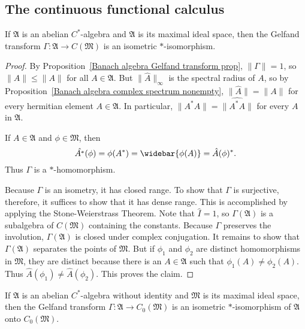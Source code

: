 \subsection{The continuous functional calculus}
\begin{theorem}\label{C^* algebra Gelfand transform prop}
If $\mathfrak{A}$ is an abelian $C^*$-algebra and $\mathfrak{A}$ is its maximal ideal space, then the Gelfand transform $\Gamma:\mathfrak{A}\to C(\mathfrak{M})$ is an isometric $*$-isomorphism.
\end{theorem}
\begin{proof}
By Proposition~\ref{Banach algebra Gelfand transform prop}, $\|\Gamma\|=1$, so $\|\hat{A}\|\leq\|A\|$ for all $A\in\mathfrak{A}$. But $\|\hat{A}\|_\infty$ is the spectral radius of $A$, so by Proposition~\ref{Banach algebra complex spectrum nonempty}, $\|\hat{A}\|=\|A\|$ for every hermitian element $A\in\mathfrak{A}$. In particular, $\|A^*A\|=\|\hat{A^*A}\|$ for every $A$ in $\mathfrak{A}$.\par
If $A\in\mathfrak{A}$ and $\phi\in\mathfrak{M}$, then
\[\hat{A^*}(\phi)=\phi(A^*)=\widebar{\phi(A)}=\hat{A}(\phi)^*.\]
Thus $\Gamma$ is a $*$-homomorphism.\par
Because $\Gamma$ is an isometry, it has closed range. To show that $\Gamma$ is surjective, therefore, it suffices to show that it has dense range. This is accomplished by applying the Stone-Weierstrass Theorem. Note that $\hat{I}=1$, so $\Gamma(\mathfrak{A})$ is a subalgebra of $C(\mathfrak{M})$ containing the constants. Because $\Gamma$ preserves the involution, $\Gamma(\mathfrak{A})$ is closed under complex conjugation. It remains to show that $\Gamma(\mathfrak{A})$ separates the points of $\mathfrak{M}$. But if $\phi_1$ and $\phi_2$ are distinct homomorphisms in $\mathfrak{M}$, they are distinct because there is an $A\in\mathfrak{A}$ such that $\phi_1(A)\neq\phi_2(A)$. Thus $\hat{A}(\phi_1)\neq\hat{A}(\phi_2)$. This proves the claim.
\end{proof}
\begin{corollary}
If $\mathfrak{A}$ is an abelian $C^*$-algebra without identity and $\mathfrak{M}$ is its maximal ideal space, then the Gelfand transform $\Gamma:\mathfrak{A}\to C_0(\mathfrak{M})$ is an isometric $*$-isomorphism of $\mathfrak{A}$ onto $C_0(\mathfrak{M})$.
\end{corollary}
